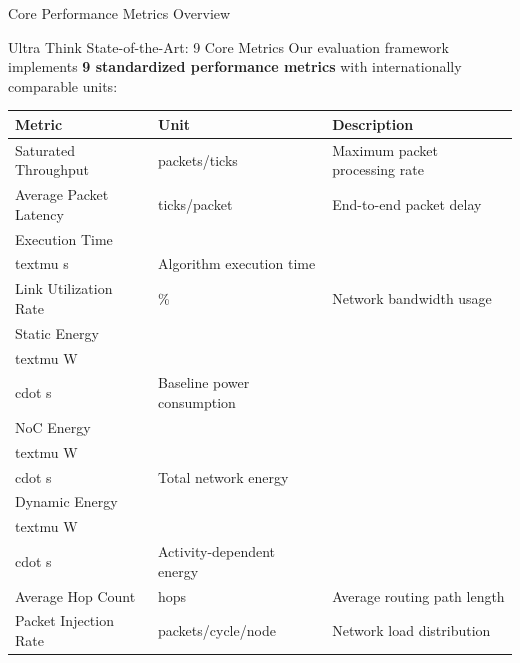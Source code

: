 \documentclass[10pt,aspectratio=169]{beamer}
\begin{document}
\begin{frame}{Core Performance Metrics Overview}
    \begin{block}{Ultra Think State-of-the-Art: 9 Core Metrics}
        Our evaluation framework implements \textbf{9 standardized performance metrics} with internationally comparable units:
    \end{block}
    
    \begin{center}
    \scriptsize
    \begin{tabular}{|l|l|l|}
        \hline
        \textbf{Metric} & \textbf{Unit} & \textbf{Description} \\
        \hline
        Saturated Throughput & packets/ticks & Maximum packet processing rate \\
        Average Packet Latency & ticks/packet & End-to-end packet delay \\
        Execution Time & \\textmu s & Algorithm execution time \\
        Link Utilization Rate & \% & Network bandwidth usage \\
        Static Energy & \\textmu W\\cdot s & Baseline power consumption \\
        NoC Energy & \\textmu W\\cdot s & Total network energy \\
        Dynamic Energy & \\textmu W\\cdot s & Activity-dependent energy \\
        Average Hop Count & hops & Average routing path length \\
        Packet Injection Rate & packets/cycle/node & Network load distribution \\
        \hline
    \end{tabular}
    \end{center}
\end{frame}
\end{document}
